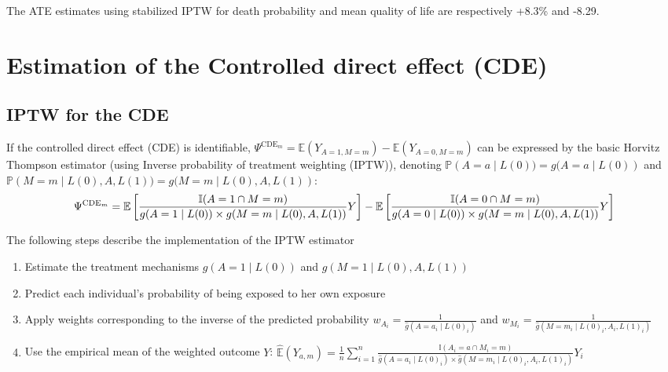 \documentclass[
]{book}
\begin{document}
The ATE estimates using stabilized IPTW for death probability and mean quality of life are respectively +8.3\% and -8.29.

\section{Estimation of the Controlled direct effect (CDE)}\label{estimation-of-the-controlled-direct-effect-cde}

\subsection{IPTW for the CDE}\label{iptw-for-the-cde}

If the controlled direct effect (CDE) is identifiable, \(\Psi^{\text{CDE}_m} = \mathbb{E}(Y_{A=1,M=m}) - \mathbb{E}(Y_{A=0,M=m})\) can be expressed by the basic Horvitz Thompson estimator (using Inverse probability of treatment weighting (IPTW)), denoting \(\mathbb{P}\left(A=a \mid L(0)) = g(A=a \mid L(0)\right)\) and \(\mathbb{P}\left(M=m \mid L(0),A,L(1)) = g(M=m \mid L(0),A,L(1)\right)\):
\begin{equation}
\small
\Psi^{\text{CDE}_m} = \mathbb{E}\left[ \frac{\mathbb{I}(A=1 \cap M=m)}{g(A=1 \mid L(0)) \times g(M=m \mid L(0),A,L(1))} Y \right] - \mathbb{E}\left[ \frac{\mathbb{I}(A=0 \cap M=m)}{g(A=0 \mid L(0)) \times g(M=m \mid L(0),A,L(1))} Y \right]
\end{equation}

The following steps describe the implementation of the IPTW estimator

\begin{enumerate}
\def\labelenumi{\arabic{enumi}.}
\item
  Estimate the treatment mechanisms \(g\left(A=1 \mid L(0)\right)\) and \(g\left(M=1 \mid L(0),A,L(1)\right)\)
\item
  Predict each individual's probability of being exposed to her own exposure
\item
  Apply weights corresponding to the inverse of the predicted probability \(w_{A_i} = \frac{1}{\hat{g}(A = a_i \mid L(0)_i)}\) and \(w_{M_i} = \frac{1}{\hat{g}(M = m_i \mid L(0)_i,A_i,L(1)_i)}\)
\item
  Use the empirical mean of the weighted outcome \(Y\): \(\hat{\mathbb{E}}(Y_{a,m}) = \frac{1}{n} \sum_{i=1}^n \frac{\mathbb{I}(A_i=a \cap M_i=m)}{\hat{g}(A=a_i \mid L(0)_i) \times \hat{g}(M=m_i \mid L(0)_i,A_i,L(1)_i)} Y_i\)
\end{enumerate}
\end{document}
